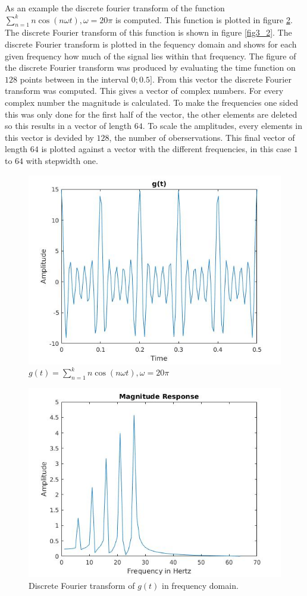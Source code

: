 \documentclass[12pt]{article}
\begin{document}
As an example the discrete fourier transform of the function $\sum_{n=1}^{k} n \cos(n\omega t), \omega = 20 \pi$ is computed. This function is plotted in figure \ref{fig3_1}. The discrete Fourier transform of this function is shown in figure \ref{fig3_2}. The discrete Fourier transform is plotted in the fequency domain and shows for each given frequency how much of the signal lies within that frequency. 
The figure of the discrete Fourier transform was produced by evaluating the time function on $128$ points between in the interval $0;0.5]$. From this vector the discrete Fourier transform was computed. This gives a vector of complex numbers. For every complex number the magnitude is calculated. To make the frequencies one sided this was only done for the first half of the vector, the other elements are deleted so this results in a vector of length $64$. To scale the amplitudes, every elements in this vector is devided by $128$, the number of oberservations. This final vector of length $64$ is plotted against a vector with the different frequencies, in this case $1$ to $64$ with stepwidth one.
\begin{figure}[H]
\centering
\includegraphics[width=0.6\linewidth]{ex3_func_wiki_1_func.jpg}
\caption{$g(t)= \sum_{n=1}^{k} n \cos(n\omega t), \omega = 20 \pi$}
\label{fig3_1}
\end{figure}
%
\begin{figure}[H]
\centering
\includegraphics[width=0.6\linewidth]{ex3_func_wiki_1_four.jpg}
\caption{Discrete Fourier transform of $g(t)$ in frequency domain.}
\label{fig3_1}
\end{figure}
\end{document}
